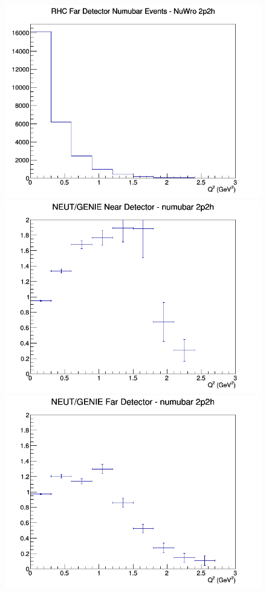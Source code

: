 \begin{figure}[h]
\endminipage
{}
\includegraphics[width=\linewidth]{eff_Q2/FGT/2p2h_RHC_FD_numubar_Q2_NuWro.png}
\endminipage
\newline
{}
\includegraphics[width=\linewidth]{eff_Q2/FGT/ratios/2p2h_NEUT_GENIE_numubar_near_Q2.png}
\endminipage
{}
\includegraphics[width=\linewidth]{eff_Q2/FGT/ratios/2p2h_NEUT_GENIE_numubar_far_Q2.png}

\end{figure}
